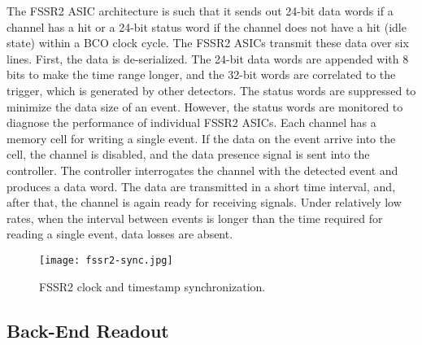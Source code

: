 The FSSR2 ASIC architecture is such that it sends out 24-bit data words if a channel has a hit or a 24-bit status word if the channel does not have a hit (idle state) within a BCO clock cycle. The FSSR2 ASICs transmit these data over six lines. First, the data is de-serialized. The 24-bit data words are appended with 8 bits to make the time range longer, and the 32-bit words are correlated to the trigger, which is generated by other detectors. The status words are suppressed to minimize the data size of an event. However, the status words are monitored to diagnose the performance of individual FSSR2 ASICs. Each channel has a memory cell for writing a single event. If the data on the event arrive into the cell, the channel is disabled, and the data presence signal is sent into the controller. The controller interrogates the channel with the detected event and produces a data word. The data are transmitted in a short time interval, and, after that, the channel is again ready for receiving signals. Under relatively low rates, when the interval between events is longer than the time required for reading a single event, data losses are absent. 

\begin{figure}[hbt] 
\centering 
\texttt{[image: fssr2-sync.jpg]}
\caption{FSSR2 clock and timestamp synchronization.}
\label{fig:fssr2-sync}
\end{figure}

\subsection{Back-End Readout}

